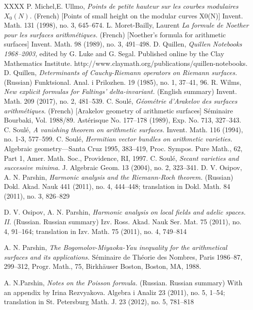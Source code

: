 \documentclass[]{amsart}
\theoremstyle{plain}
\theoremstyle{remark} \newtheorem{remark}[thm]{Remark}
\theoremstyle{remark} \newtheorem{exercise}{Exercise}
\theoremstyle{remark} \newtheorem{example}{Example}
\numberwithin{equation}{section}
\begin{document}
\begin{thebibliography}{XXXX}
P. Michel,E. Ullmo, {\em Points de petite hauteur sur les courbes modulaires $X_0(N)$.} (French) [Points of small height on the modular curves X0(N)] Invent. Math. 131 (1998), no. 3, 645--674. 
L. Moret-Bailly, Laurent {\em La formule de Noether pour les surfaces arithm\'{e}tiques.} (French) [Noether's formula for arithmetic surfaces]
Invent. Math. 98 (1989), no. 3, 491--498.
D. Quillen, {\em Quillen Notebooks 1968--2003,} edited by G. Luke and G. Segal. Published online by the Clay Mathematics Institute. http://www.claymath.org/publications/quillen-notebooks.
D. Quillen, {\em Determinants of Cauchy-Riemann operators on Riemann surfaces.} (Russian)
Funktsional. Anal. i Prilozhen. 19 (1985), no. 1, 37--41, 96.
R. Wilms, {\em New explicit formulas for Faltings' delta-invariant.} (English summary)
Invent. Math. 209 (2017), no. 2, 481--539.
C. Soul\'{e}, {\em G\'{e}om\'{e}trie d'Arakelov des surfaces arithm\'{e}tiques.} (French) [Arakelov geometry of arithmetic surfaces]
Séminaire Bourbaki, Vol. 1988/89.
Ast\'{e}risque No. 177--178 (1989), Exp. No. 713, 327--343.
C. Soul\'{e}, {\em A vanishing theorem on arithmetic surfaces.} Invent. Math. 116 (1994), no. 1-3, 577--599.
C. Soul\'{e}, {\em 
Hermitian vector bundles on arithmetic varieties.} Algebraic geometry—Santa Cruz 1995, 383--419,
Proc. Sympos. Pure Math., 62, Part 1, Amer. Math. Soc., Providence, RI, 1997.
C. Soul\'{e}, {\em Secant varieties and successive minima.} J. Algebraic Geom. 13 (2004), no. 2, 323--341. 
 D. V. Osipov, A. N. Parshin, {\em 
Harmonic analysis and the Riemann-Roch theorem.} (Russian)
Dokl. Akad. Nauk 441 (2011), no. 4, 444--448; translation in
Dokl. Math. 84 (2011), no. 3, 826--829

 D. V. Osipov, A. N. Parshin, {\em 
Harmonic analysis on local fields and adelic spaces. II.} (Russian. Russian summary)
Izv. Ross. Akad. Nauk Ser. Mat. 75 (2011), no. 4, 91--164; translation in
Izv. Math. 75 (2011), no. 4, 749--814

A. N. Parshin, {\em The Bogomolov-Miyaoka-Yau inequality for the arithmetical surfaces and its applications.} S\'{e}minaire de Th\'{e}orie des Nombres, Paris 1986--87, 299--312,
Progr. Math., 75, Birkhäuser Boston, Boston, MA, 1988.

A. N.Parshin, {\em Notes on the Poisson formula.} (Russian. Russian summary) With an appendix by Irina Rezvyakova.
Algebra i Analiz 23 (2011), no. 5, 1--54; translation in
St. Petersburg Math. J. 23 (2012), no. 5, 781--818



\end{thebibliography}
\end{document}
